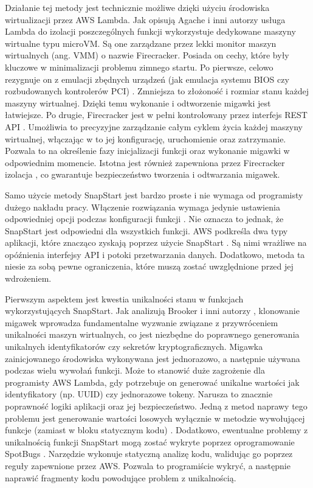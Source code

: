 Działanie tej metody jest technicznie możliwe dzięki użyciu środowiska wirtualizacji przez AWS Lambda.
Jak opisują Agache i inni autorzy \cite{246288} usługa Lambda do izolacji poszczególnych funkcji wykorzystuje dedykowane maszyny wirtualne typu microVM.
Są one zarządzane przez lekki monitor maszyn wirtualnych (ang. VMM) o nazwie Firecracker.
Posiada on cechy, które były kluczowe w minimalizacji problemu zimnego startu.
Po pierwsze, celowo rezygnuje on z emulacji zbędnych urządzeń (jak emulacja systemu BIOS czy rozbudowanych kontrolerów PCI) \cite{246288}.
Zmniejsza to złożoność i rozmiar stanu każdej maszyny wirtualnej. 
Dzięki temu wykonanie i odtworzenie migawki jest łatwiejsze.
Po drugie, Firecracker jest w pełni kontrolowany przez interfejs REST API \cite{246288}.
Umożliwia to precyzyjne zarządzanie całym cyklem życia każdej maszyny wirtualnej, włączając w to jej konfigurację, uruchomienie oraz zatrzymanie.
Pozwala to na określenie fazy inicjalizacji funkcji oraz wykonanie migawki w odpowiednim momencie.
Istotna jest również zapewniona przez Firecracker izolacja \cite{246288}, co gwarantuje bezpieczeństwo tworzenia i odtwarzania migawek.

Samo użycie metody SnapStart jest bardzo proste i nie wymaga od programisty dużego nakładu pracy.
Włączenie rozwiązania wymaga jedynie ustawienia odpowiedniej opcji podczas konfiguracji funkcji \cite{amazonSnapstartDeveloperGUide}.
Nie oznacza to jednak, że SnapStart jest odpowiedni dla wszystkich funkcji.
AWS podkreśla dwa typy aplikacji, które znacząco zyskają poprzez użycie SnapStart \cite{amazonSnapstartDeveloperGUide}.
Są nimi wrażliwe na opóźnienia interfejsy API i potoki przetwarzania danych.
Dodatkowo, metoda ta niesie za sobą pewne ograniczenia, które muszą zostać uwzględnione przed jej wdrożeniem.

Pierwszym aspektem jest kwestia unikalności stanu w funkcjach wykorzystujących SnapStart.
Jak analizują Brooker i inni autorzy \cite{brooker2021restoringuniquenessmicrovmsnapshots}, klonowanie migawek wprowadza fundamentalne wyzwanie związane z przywróceniem unikalności maszyn wirtualnych, co jest niezbędne do poprawnego generowania unikalnych identyfikatorów czy sekretów kryptograficznych.
Migawka zainicjowanego środowiska wykonywana jest jednorazowo, a następnie używana podczas wielu wywołań funkcji.
Może to stanowić duże zagrożenie dla programisty AWS Lambda, gdy potrzebuje on generować unikalne wartości jak identyfikatory (np. UUID) czy jednorazowe tokeny.
Narusza to znacznie poprawność logiki aplikacji oraz jej bezpieczeństwo.
Jedną z metod naprawy tego problemu jest generowanie wartości losowych wyłącznie w metodzie wywołującej funkcje (zamiast w bloku statycznym kodu) \cite{amazonSnapstartDeveloperGUide}.
Dodatkowo, ewentualne problemy z unikalnością funkcji SnapStart mogą zostać wykryte poprzez oprogramowanie SpotBugs \cite{SpotBugsProject}.
Narzędzie wykonuje statyczną analizę kodu, walidując go poprzez reguły zapewnione przez AWS.
Pozwala to programiście wykryć, a następnie naprawić fragmenty kodu powodujące problem z unikalnością.


